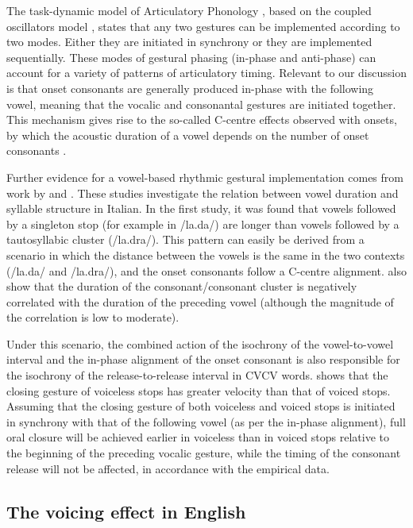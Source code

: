 \documentclass[
  12pt,
  a4paper,
  authoryear, 5p]{elsarticle}
\begin{document}
The task-dynamic model \citep{saltzman2008} of Articulatory Phonology
\citep{ohala1986a, browman1988, browman1992}, based on the coupled
oscillators model \citep{odell2008}, states that any two gestures can be
implemented according to two modes. Either they are initiated in
synchrony or they are implemented sequentially. These modes of gestural
phasing (in-phase and anti-phase) can account for a variety of patterns
of articulatory timing. Relevant to our discussion is that onset
consonants are generally produced in-phase with the following vowel,
meaning that the vocalic and consonantal gestures are initiated
together. This mechanism gives rise to the so-called C-centre effects
observed with onsets, by which the acoustic duration of a vowel depends
on the number of onset consonants
\citep{browman1988, marin2010, hermes2013, marin2014}.

Further evidence for a vowel-based rhythmic gestural implementation
comes from work by \citet{farnetani1986} and \citet{celata2014}. These
studies investigate the relation between vowel duration and syllable
structure in Italian. In the first study, it was found that vowels
followed by a singleton stop (for example in /la.da/) are longer than
vowels followed by a tautosyllabic cluster (/la.dra/). This pattern can
easily be derived from a scenario in which the distance between the
vowels is the same in the two contexts (/la.da/ and /la.dra/), and the
onset consonants follow a C-centre alignment. \citet{celata2014} also
show that the duration of the consonant/consonant cluster is negatively
correlated with the duration of the preceding vowel (although the
magnitude of the correlation is low to moderate).

Under this scenario, the combined action of the isochrony of the
vowel-to-vowel interval and the in-phase alignment of the onset
consonant is also responsible for the isochrony of the
release-to-release interval in CVCV words. \citet{van-summers1987} shows
that the closing gesture of voiceless stops has greater velocity than
that of voiced stops. Assuming that the closing gesture of both
voiceless and voiced stops is initiated in synchrony with that of the
following vowel (as per the in-phase alignment), full oral closure will
be achieved earlier in voiceless than in voiced stops relative to the
beginning of the preceding vocalic gesture, while the timing of the
consonant release will not be affected, in accordance with the empirical
data.

\hypertarget{the-voicing-effect-in-english}{%
\subsection{The voicing effect in
English}\label{the-voicing-effect-in-english}}
\end{document}
